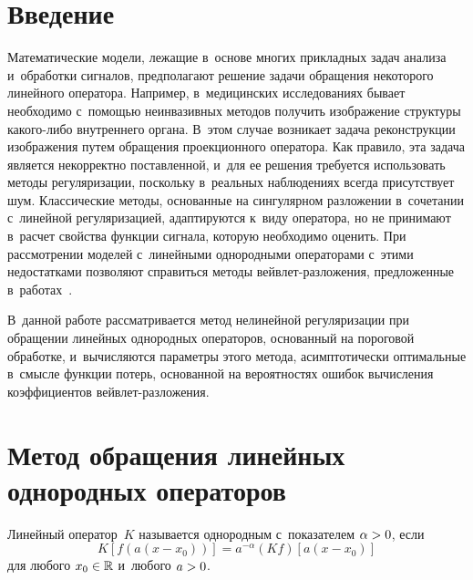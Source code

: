 
  
\vspace*{6pt}



\thispagestyle{headings}

\begin{multicols}{2}

\label{st\stat}

\section{Введение}

Математические модели, лежащие в~основе многих прикладных задач анализа и~обработки 
сигналов, предполагают решение задачи обращения некоторого линейного оператора. 
Например, в~медицинских исследованиях бывает необходимо с~по\-мощью неинвазивных 
методов получить изоб\-ра\-же\-ние структуры ка\-ко\-го-ли\-бо внут\-рен\-не\-го органа. 
В~этом случае возникает задача реконструкции изоб\-ра\-же\-ния путем обращения 
проекционного оператора. Как правило, эта задача является некорректно 
поставленной, и~для ее решения требуется использовать методы регуляризации, 
поскольку в~реальных наблюдениях всегда присутствует шум. Классические методы, 
основанные на сингулярном разложении в~сочетании с~линейной регуляризацией, 
адаптируются к~виду оператора, но не принимают в~расчет свойства функции сигнала, 
которую необходимо оценить. При рассмотрении моделей с~линейными однородными 
операторами с~этими недостатками позволяют справиться методы вейв\-лет-раз\-ло\-же\-ния, 
предложенные в~работах~\cite{Abr98, Don95}. 

В~данной работе рас\-смат\-ри\-ва\-ет\-ся 
метод нелинейной регуляризации при обращении линейных однородных операторов, 
основанный на пороговой обработке, и~вы\-чис\-ля\-ют\-ся па\-ра\-мет\-ры этого метода, 
асимптотически оптимальные в~смыс\-ле функции потерь, основанной на вероятностях 
ошибок вы\-чис\-ле\-ния коэффициентов вейв\-лет-раз\-ло\-же\-ния.

\section{Метод обращения линейных однородных операторов}

Линейный оператор~$K$ называется однородным с~показателем $\alpha\hm>0$, если
$$
K\left[f\left(a\left(x-x_0\right)\right)\right]=a^{-\alpha}(Kf)\left[a\left(x-x_0\right)\right]
$$
для любого $x_0\hm\in\r$ и~любого $a\hm>0$.


\end{multicols}
